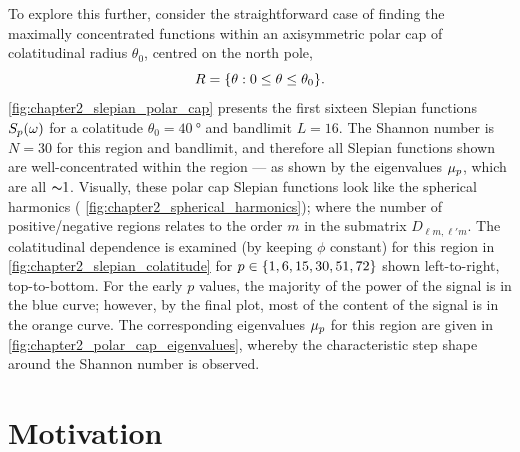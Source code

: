 To explore this further, consider the straightforward case of finding the maximally concentrated functions within an axisymmetric polar cap of colatitudinal radius \(\theta_{0}\), centred on the north pole, \ie{}
%
\begin{equation}
	R
	= \{\theta: 0 \leq \theta \leq \theta_{0}\}.
\end{equation}
%
\cref{fig:chapter2_slepian_polar_cap} presents the first sixteen Slepian functions \({S}_{p}(\omega)\) for a colatitude \(\theta_{0}=\SI{40}{\degree}\) and bandlimit \(L=16\).
The Shannon number is \(N=30\) for this region and bandlimit, and therefore all Slepian functions shown are well-concentrated within the region --- as shown by the eigenvalues \({\mu}_{p}\), which are all \({\thicksim}\num{1}\).
Visually, these polar cap Slepian functions look like the spherical harmonics (\cf{} \cref{fig:chapter2_spherical_harmonics}); where the number of positive/negative regions relates to the order \(m\) in the submatrix \(D_{\ell m,\ell'm}\).
The colatitudinal dependence is examined (by keeping \(\phi{}\) constant) for this region in \cref{fig:chapter2_slepian_colatitude} for \(p \in \{1,6,15,30,51,72\}\) shown left-to-right, top-to-bottom.
For the early \(p\) values, the majority of the power of the signal is in the blue curve; however, by the final plot, most of the content of the signal is in the orange curve.
The corresponding eigenvalues \({\mu}_{p}\) for this region are given in \cref{fig:chapter2_polar_cap_eigenvalues}, whereby the characteristic step shape around the Shannon number is observed.





\section{Motivation}\label{sec:chapter2_motivation}

